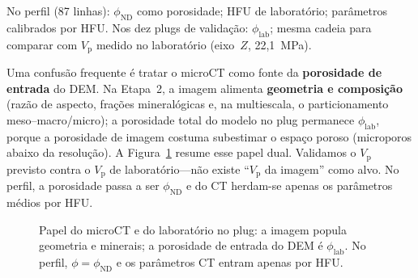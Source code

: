 \documentclass[11pt,a4paper]{article}
\numberwithin{equation}{section}
\newcommand{\philab}{\ensuremath{\phi_{\mathrm{lab}}}}
\newcommand{\phiND}{\ensuremath{\phi_{\mathrm{ND}}}}
\newcommand{\Vp}{\ensuremath{V_{\mathrm{p}}}}
\newcommand{\Vs}{\ensuremath{V_{\mathrm{s}}}}
\begin{document}
No perfil (87 linhas): \phiND{} como porosidade; HFU de laboratório;
parâmetros calibrados por HFU.
Nos dez plugs de validação: \philab{}; mesma cadeia para comparar com
\Vp{} medido no laboratório (eixo~$Z$, 22,1~MPa).

Uma confusão frequente é tratar o microCT como fonte da \textbf{porosidade
de entrada} do DEM.
Na Etapa~2, a imagem alimenta \textbf{geometria e composição}
(razão de aspecto, frações mineralógicas e, na multiescala, o
particionamento meso--macro/micro); a porosidade total do modelo no plug
permanece \philab{}, porque a porosidade de imagem costuma subestimar o
espaço poroso (microporos abaixo da resolução).
A Figura~\ref{fig:plug_inputs} resume esse papel dual.
Validamos o \Vp{} previsto contra o \Vp{} de laboratório---não existe
``\Vp{} da imagem'' como alvo.
No perfil, a porosidade passa a ser \phiND{} e do CT herdam-se apenas os
parâmetros médios por HFU.

\begin{figure}[H]
  \centering
  \caption{Papel do microCT e do laboratório no plug: a imagem popula
           geometria e minerais; a porosidade de entrada do DEM é
           \philab{}. No perfil, $\phi=\phiND{}$ e os parâmetros CT
           entram apenas por HFU.}
  \label{fig:plug_inputs}
\end{figure}
\end{document}
